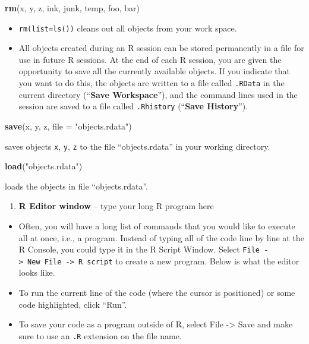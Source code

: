 \documentclass[]{book}
\newenvironment{Shaded}{\begin{snugshade}}{\end{snugshade}}
\newcommand{\KeywordTok}[1]{\textcolor[rgb]{0.13,0.29,0.53}{\textbf{#1}}}
\newcommand{\DataTypeTok}[1]{\textcolor[rgb]{0.13,0.29,0.53}{#1}}
\newcommand{\StringTok}[1]{\textcolor[rgb]{0.31,0.60,0.02}{#1}}
\newcommand{\NormalTok}[1]{#1}
\providecommand{\tightlist}{%
  \setlength{\itemsep}{0pt}\setlength{\parskip}{0pt}}
\begin{document}
\begin{Shaded}
\begin{Highlighting}[]
\KeywordTok{rm}\NormalTok{(x, y, z, ink, junk, temp, foo, bar)}
\end{Highlighting}
\end{Shaded}

\begin{itemize}
\item
  \texttt{rm(list=ls())} cleans out all objects from your work space.
\item
  All objects created during an R session can be stored permanently in a
  file for use in future R sessions. At the end of each R session, you
  are given the opportunity to save all the currently available objects.
  If you indicate that you want to do this, the objects are written to a
  file called \texttt{.RData} in the current directory (``\textbf{Save
  Workspace}''), and the command lines used in the session are saved to
  a file called \texttt{.Rhistory} (``\textbf{Save History}'').
\end{itemize}

\begin{Shaded}
\begin{Highlighting}[]
\KeywordTok{save}\NormalTok{(x, y, z, }\DataTypeTok{file =} \StringTok{"objects.rdata"}\NormalTok{) }
\end{Highlighting}
\end{Shaded}

saves objects \texttt{x}, \texttt{y}, \texttt{z} to the file
``objects.rdata'' in your working directory.

\begin{Shaded}
\begin{Highlighting}[]
\KeywordTok{load}\NormalTok{(}\StringTok{"objects.rdata"}\NormalTok{) }
\end{Highlighting}
\end{Shaded}

loads the objects in file ``objects.rdata''.

\begin{enumerate}
\def\labelenumi{\arabic{enumi}.}
\setcounter{enumi}{1}
\tightlist
\item
  \textbf{R Editor window} -- type your long R program here
\end{enumerate}

\begin{itemize}
\item
  Often, you will have a long list of commands that you would like to
  execute all at once, i.e., a program. Instead of typing all of the
  code line by line at the R Console, you could type it in the R Script
  Window. Select
  \texttt{File\ -\textgreater{}\ New\ File\ -\textgreater{}\ R\ script}
  to create a new program. Below is what the editor looks like.
\item
  To run the current line of the code (where the cursor is positioned)
  or some code highlighted, click ``Run''.
\item
  To save your code as a program outside of R, select File
  -\textgreater{} Save and make sure to use an \texttt{.R} extension on
  the file name.
\end{itemize}
\end{document}
